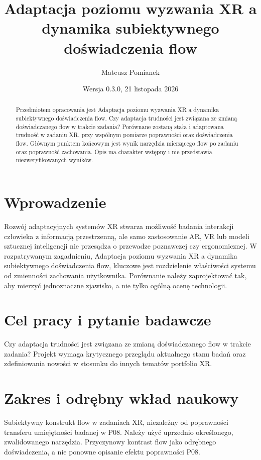 \documentclass[11pt,a4paper]{article}
\title{Adaptacja poziomu wyzwania XR a dynamika subiektywnego doświadczenia flow}
\author{Mateusz Pomianek}
\date{Wersja 0.3.0, 21 listopada 2026}
\begin{document}
\maketitle

\begin{abstract}

Przedmiotem opracowania jest Adaptacja poziomu wyzwania XR a dynamika subiektywnego doświadczenia flow. Czy adaptacja trudności jest związana ze zmianą doświadczanego flow w trakcie zadania? Porównane zostaną stała i adaptowana trudność w zadaniu XR, przy wspólnym pomiarze poprawności oraz doświadczenia flow. Głównym punktem końcowym jest wynik narzędzia mierzącego flow po zadaniu oraz poprawność zachowania. Opis ma charakter wstępny i nie przedstawia niezweryfikowanych wyników.

\end{abstract}

\section{Wprowadzenie}

Rozwój adaptacyjnych systemów XR stwarza możliwość badania interakcji człowieka z informacją przestrzenną, ale samo zastosowanie AR, VR lub modeli sztucznej inteligencji nie przesądza o przewadze poznawczej czy ergonomicznej. W rozpatrywanym zagadnieniu, Adaptacja poziomu wyzwania XR a dynamika subiektywnego doświadczenia flow, kluczowe jest rozdzielenie właściwości systemu od zmienności zachowania użytkownika. Porównanie należy zaprojektować tak, aby mierzyć jednoznaczne zjawisko, a nie tylko ogólną ocenę technologii.

\section{Cel pracy i pytanie badawcze}

Czy adaptacja trudności jest związana ze zmianą doświadczanego flow w trakcie zadania? Projekt wymaga krytycznego przeglądu aktualnego stanu badań oraz zdefiniowania nowości w stosunku do innych tematów portfolio XR.

\section{Zakres i odrębny wkład naukowy}
Subiektywny konstrukt flow w zadaniach XR, niezależny od poprawności transferu umiejętności badanej w P08. Należy użyć uprzednio określonego, zwalidowanego narzędzia. Przyczynowy kontrast flow jako odrębnego doświadczenia, a nie ponowne opisanie efektu poprawności P08.
\end{document}
